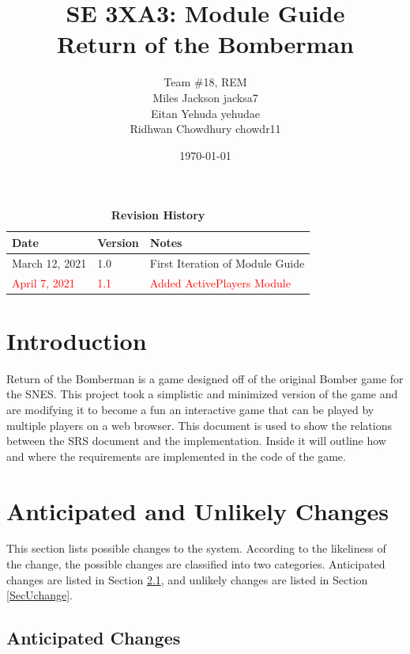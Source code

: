 \documentclass[12pt, titlepage]{article}
\title{SE 3XA3: Module Guide\\Return of the Bomberman}
\author{Team \#18, REM
		\\ Miles Jackson  jacksa7
		\\ Eitan Yehuda  yehudae
		\\ Ridhwan Chowdhury chowdr11
}
\date{\today}
\begin{document}
\maketitle

\tableofcontents
\listoftables
\listoffigures

\begin{table}[bp]
\caption{\bf Revision History}
\begin{tabularx}{\textwidth}{p{3cm}p{2cm}X}
\toprule {\bf Date} & {\bf Version} & {\bf Notes}\\
\midrule
March 12, 2021 & 1.0 & First Iteration of Module Guide\\
\textcolor{red}{April 7, 2021} & \textcolor{red}{1.1} & \textcolor{red}{Added ActivePlayers Module}\\
\bottomrule
\end{tabularx}
\end{table}

\newpage


\section{Introduction}

Return of the Bomberman is a game designed off of the original Bomber game for the SNES. This project took a simplistic and minimized version of the game and are modifying it to become a fun an interactive game that can be played by multiple players on a web browser. This document is used to show the relations between the SRS document and the implementation. Inside it will outline how and where the requirements are implemented in the code of the game. 

\section{Anticipated and Unlikely Changes} \label{SecChange}

This section lists possible changes to the system. According to the likeliness
of the change, the possible changes are classified into two
categories. Anticipated changes are listed in Section \ref{SecAchange}, and
unlikely changes are listed in Section \ref{SecUchange}.

\subsection{Anticipated Changes} \label{SecAchange}
\end{document}

